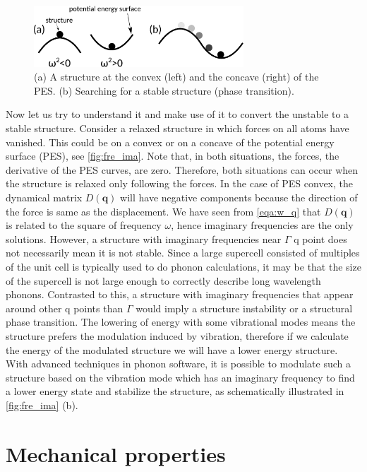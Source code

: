 \begin{figure}[htbp!] 
\centering  
\includegraphics[width=0.7\textwidth]{fre_ima.eps}
\caption{ (a) A structure at the convex (left) and the concave (right) of the PES. (b) Searching for a stable structure (phase transition).}  
\label{fig:fre_ima}
\end{figure} 

Now let us try to understand it and make use of it to convert the unstable to a stable structure. Consider a relaxed structure in which forces on all atoms have vanished. This could be on a convex or on a concave of the potential energy surface (PES), see \autoref{fig:fre_ima}. Note that, in both situations, the forces, the derivative of the PES curves, are zero. Therefore, both situations can occur when the structure is relaxed only following the forces. In the case of PES convex, the dynamical matrix $D(\mathbf{q})$ will have negative components because the direction of the force is same as the displacement. We have seen from \autoref{eqa:w_q} that $D(\mathbf{q})$ is related to the square of frequency $\omega$, hence imaginary frequencies are the only solutions. However, a structure with imaginary frequencies near $\Gamma$ q point does not necessarily mean it is not stable. Since a large supercell consisted of multiples of the unit cell is typically used to do phonon calculations, it may be that the size of the supercell is not large enough to correctly describe long wavelength phonons. Contrasted to this, a structure with imaginary frequencies that appear around other q points than $\Gamma$ would imply a structure instability or a structural phase transition. The lowering of energy with some vibrational modes means the structure prefers the modulation induced by vibration, therefore if we calculate the energy of the modulated structure we will have a lower energy structure. With advanced techniques in phonon software\cite[e.g.][]{phonopya}, it is possible to modulate such a structure based on the vibration mode which has an imaginary frequency to find a lower energy state and stabilize the structure, as schematically illustrated in \autoref{fig:fre_ima} (b). 



\section{Mechanical properties}

